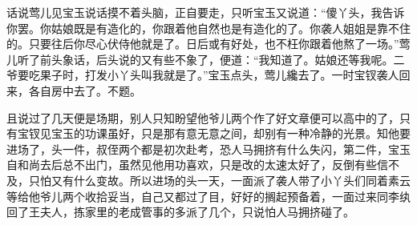 


\begin{parag}
    话说莺儿见宝玉说话摸不着头脑，正自要走，只听宝玉又说道：“傻丫头，我告诉你罢。你姑娘既是有造化的，你跟着他自然也是有造化的了。你袭人姐姐是靠不住的。只要往后你尽心伏侍他就是了。日后或有好处，也不枉你跟着他熬了一场。”莺儿听了前头象话，后头说的又有些不象了，便道：“我知道了。姑娘还等我呢。二爷要吃果子时，打发小丫头叫我就是了。”宝玉点头，莺儿纔去了。一时宝钗袭人回来，各自房中去了。不题。
\end{parag}


\begin{parag}
    且说过了几天便是场期，别人只知盼望他爷儿两个作了好文章便可以高中的了，只有宝钗见宝玉的功课虽好，只是那有意无意之间，却别有一种冷静的光景。知他要进场了，头一件，叔侄两个都是初次赴考，恐人马拥挤有什么失闪，第二件，宝玉自和尚去后总不出门，虽然见他用功喜欢，只是改的太速太好了，反倒有些信不及，只怕又有什么变故。所以进场的头一天，一面派了袭人带了小丫头们同着素云等给他爷儿两个收拾妥当，自己又都过了目，好好的搁起预备着，一面过来同李纨回了王夫人，拣家里的老成管事的多派了几个，只说怕人马拥挤碰了。
\end{parag}


